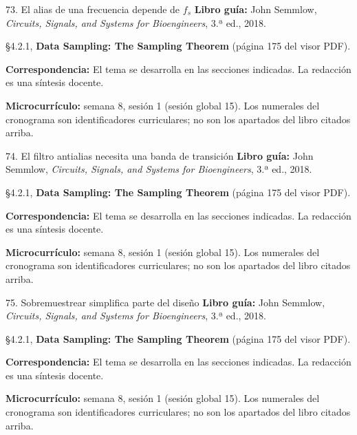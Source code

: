 \documentclass[
  10pt,
  ignorenonframetext,
  aspectratio=169,
  spanish,
]{beamer}
\begin{document}
\begin{frame}{73. El alias de una frecuencia depende de \(f_s\)}
\label{el-alias-de-una-frecuencia-depende-de-f_s}
\textbf{Libro guía:} John Semmlow, \emph{Circuits, Signals, and Systems
for Bioengineers}, 3.ª ed., 2018.

§4.2.1, \textbf{Data Sampling: The Sampling Theorem} (página 175 del
visor PDF).

\textbf{Correspondencia:} El tema se desarrolla en las secciones
indicadas. La redacción es una síntesis docente.

\textbf{Microcurrículo:} semana 8, sesión 1 (sesión global 15). Los
numerales del cronograma son identificadores curriculares; no son los
apartados del libro citados arriba.
\end{frame}

\begin{frame}{74. El filtro antialias necesita una banda de transición}
\label{el-filtro-antialias-necesita-una-banda-de-transiciuxf3n}
\textbf{Libro guía:} John Semmlow, \emph{Circuits, Signals, and Systems
for Bioengineers}, 3.ª ed., 2018.

§4.2.1, \textbf{Data Sampling: The Sampling Theorem} (página 175 del
visor PDF).

\textbf{Correspondencia:} El tema se desarrolla en las secciones
indicadas. La redacción es una síntesis docente.

\textbf{Microcurrículo:} semana 8, sesión 1 (sesión global 15). Los
numerales del cronograma son identificadores curriculares; no son los
apartados del libro citados arriba.
\end{frame}

\begin{frame}{75. Sobremuestrear simplifica parte del diseño}
\label{sobremuestrear-simplifica-parte-del-diseuxf1o}
\textbf{Libro guía:} John Semmlow, \emph{Circuits, Signals, and Systems
for Bioengineers}, 3.ª ed., 2018.

§4.2.1, \textbf{Data Sampling: The Sampling Theorem} (página 175 del
visor PDF).

\textbf{Correspondencia:} El tema se desarrolla en las secciones
indicadas. La redacción es una síntesis docente.

\textbf{Microcurrículo:} semana 8, sesión 1 (sesión global 15). Los
numerales del cronograma son identificadores curriculares; no son los
apartados del libro citados arriba.
\end{frame}
\end{document}
